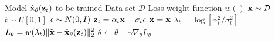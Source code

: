 \documentclass[hidelinks]{article} %
\begin{document}
\begin{minipage}{0.44\textwidth}
\begin{algorithm}[H]
\centering
\caption{Standard diffusion training}\label{alg:dif_train}
\begin{algorithmic}
\Require Model $\hat{\mathbf{x}}_\theta(\mathbf{z}_t)$ to be trained
\Require Data set $\mathcal{D}$
\Require Loss weight function $w()$
\State \vspace{0.83cm}
\State ${\mathbf{x}} \sim \mathcal{D}$ 
\State $t \sim U[0, 1]$ 
\State ${\mathbf{\epsilon}} \sim N(0, I)$ 
\State ${\mathbf{z}}_t = \alpha_t {\mathbf{x}} + \sigma_t {\mathbf{\epsilon}}$ 
\State \vspace{1.49cm}
\State $\tilde{{\mathbf{x}}} = {\mathbf{x}}$ 
\State $\lambda_t = \log[\alpha^{2}_t / \sigma^{2}_t]$ 
\State $L_{\theta} = w(\lambda_t) \lVert \tilde{{\mathbf{x}}} -  \hat{\mathbf{x}}_\theta(\mathbf{z}_t)\rVert_{2}^{2}$ 
\State $\theta \leftarrow \theta - \gamma\nabla_{\theta}L_{\theta}$ 
\EndWhile
\State \vspace{0.78cm}
\end{algorithmic}
\end{algorithm}
\end{minipage}
\hfill
\end{document}
